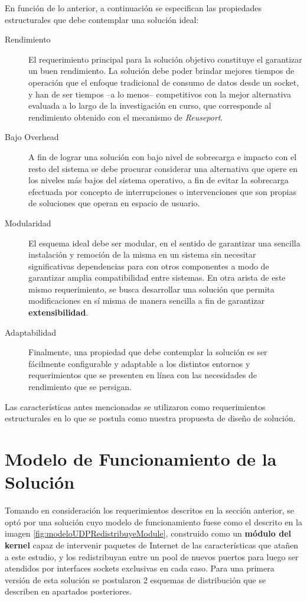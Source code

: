 En función de lo anterior, a continuación se especifican las propiedades estructurales que debe contemplar una solución ideal:

\begin{description}
\item[Rendimiento] El requerimiento principal para la solución objetivo constituye el garantizar un buen rendimiento. La solución debe poder brindar mejores tiempos de operación que el enfoque tradicional de consumo de datos desde un socket, y han de ser tiempos --a lo menos-- competitivos con la mejor alternativa evaluada a lo largo de la investigación en curso, que corresponde al rendimiento obtenido con el mecanismo de \emph{Reuseport}.
\item[Bajo Overhead] A fin de lograr una solución con bajo  nivel de sobrecarga e impacto con el resto del sistema se debe procurar considerar una alternativa que opere en los niveles más bajos del sistema operativo, a fin de evitar la sobrecarga efectuada por concepto de interrupciones o intervenciones que son propias de soluciones que operan en espacio de usuario.
\item[Modularidad] El esquema ideal debe ser modular, en el sentido de garantizar una sencilla instalación y remoción de la misma en un sistema sin necesitar significativas dependencias para con otros componentes a modo de garantizar amplia compatibilidad entre sistemas. En otra arista de este mismo requerimiento, se busca desarrollar una solución que permita modificaciones en sí misma de manera sencilla a fin de garantizar \textbf{extensibilidad}.
\item[Adaptabilidad] Finalmente, una propiedad que debe contemplar la solución es ser fácilmente configurable y adaptable a los distintos entornos y requerimientos que se presenten en línea con las necesidades de rendimiento que se persigan.
\end{description}

Las características antes mencionadas se utilizaron como requerimientos estructurales en lo que se postula como nuestra propuesta de diseño de solución.

\section{Modelo de Funcionamiento de la Solución}
Tomando en consideración los requerimientos descritos en la sección anterior, se optó por una solución cuyo modelo de funcionamiento fuese como el descrito en la imagen \ref{fig:modeloUDPRedistribuyeModule}, construido como un \textbf{módulo del kernel} capaz de intervenir paquetes de Internet de las características que atañen a este estudio, y los redistribuyan entre un pool de nuevos puertos para luego ser atendidos por interfaces sockets exclusivas en cada caso. Para una primera versión de esta solución se postularon 2 esquemas de distribución que se describen en apartados posteriores.


